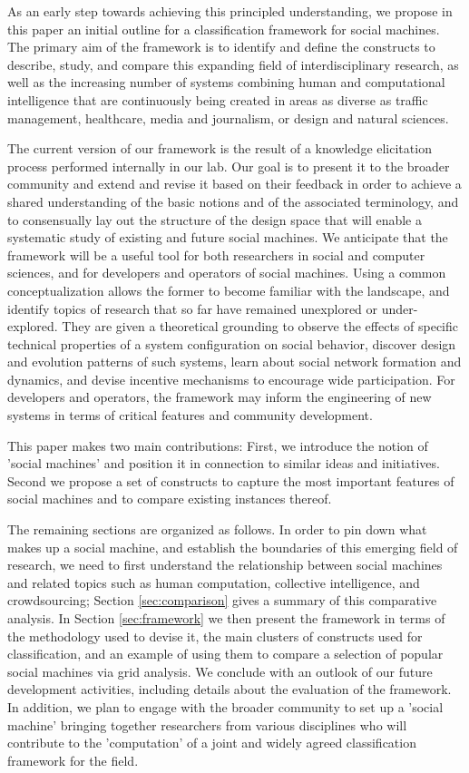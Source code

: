 \documentclass{sig-alternate}
\begin{document}
As an early step towards achieving this principled understanding, we propose in this paper an initial outline for a classification framework for social machines. The primary aim of the framework is to identify and define the constructs to describe, study, and compare this expanding field of interdisciplinary research, as well as the increasing number of systems combining human and computational intelligence that are continuously being created in areas as diverse as traffic management, healthcare, media and journalism, or design and natural sciences.

The current version of our framework is the result of a knowledge elicitation process performed internally in our lab. Our goal is to present it to the broader community and extend and revise it based on their feedback in order to achieve a shared understanding of the basic notions and of the associated terminology, and to consensually lay out the structure of the design space that will enable a systematic study of existing and future social machines. We anticipate that the framework will be a useful tool for both researchers in social and computer sciences, and for developers and operators of social machines. Using a common conceptualization allows the former to become familiar with the landscape, and identify topics of research that so far have remained unexplored or under-explored. They are given a theoretical grounding to observe the effects of specific technical properties of a system configuration on social behavior, discover design and evolution patterns of such systems, learn about social network formation and dynamics, and devise incentive mechanisms to encourage wide participation. For developers and operators, the framework may inform the engineering of new systems in terms of critical features and community development.

This paper makes two main contributions: First, we introduce the notion of 'social machines' and position it in connection to similar ideas and initiatives. Second we propose a set of constructs to capture the most important features of social machines and to compare existing instances thereof.

The remaining sections are organized as follows. In order to pin down what makes up a social machine, and establish the boundaries of this emerging field of research, we need to first understand the relationship between social machines and related topics such as human computation, collective intelligence, and crowdsourcing; Section \ref{sec:comparison} gives a summary of this comparative analysis. In Section \ref{sec:framework} we then present the framework in terms of the methodology used to devise it, the main clusters of constructs used for classification, and an example of using them to compare a selection of popular social machines via grid analysis. We conclude with an outlook of our future development activities, including details about the evaluation of the framework. In addition, we plan to engage with the broader community to set up a 'social machine' bringing together researchers from various disciplines who will contribute to the 'computation' of a joint and widely agreed classification framework for the field.
\end{document}
